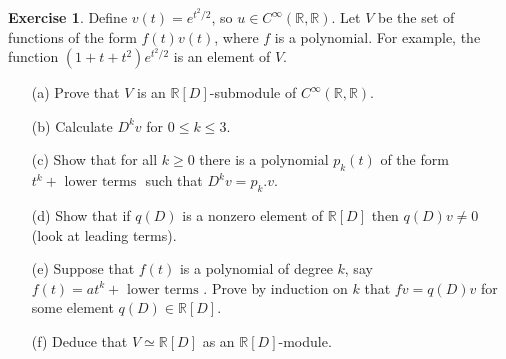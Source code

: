 \documentclass{amsart}
\newcommand{\R}         {{\mathbb{R}}}
\newcommand{\CRR}       {C^\infty(\R,\R)}
\newcommand{\ip}[1]     {\langle #1\rangle}
\renewcommand{\:}{\colon}
\theoremstyle{definition}
\newtheorem{exercise}{Exercise}[section]
\begin{document}
\begin{exercise}
 Define $v(t)=e^{t^2/2}$, so $u\in\CRR$.  Let $V$ be the set of
 functions of the form $f(t)v(t)$, where $f$ is a polynomial.  For
 example, the function $(1+t+t^2)e^{t^2/2}$ is an element of $V$.
 \begin{itemize}
  \item[(a)] Prove that $V$ is an $\R[D]$-submodule of $\CRR$.
  \item[(b)] Calculate $D^kv$ for $0\leq k\leq 3$.
  \item[(c)] Show that for all $k\geq 0$ there is a polynomial
   $p_k(t)$ of the form $t^k+\text{ lower terms }$ such that
   $D^kv=p_k.v$. 
  \item[(d)] Show that if $q(D)$ is a nonzero element of $\R[D]$ then
   $q(D)v\neq 0$ (look at leading terms).  
  \item[(e)] Suppose that $f(t)$ is a polynomial of degree $k$, say
   $f(t)=at^k+\text{ lower terms }$.  Prove by induction on $k$ that
   $fv=q(D)v$ for some element $q(D)\in\R[D]$.
  \item[(f)] Deduce that $V\simeq\R[D]$ as an $\R[D]$-module. 
 \end{itemize}
\end{exercise}
\end{document}
